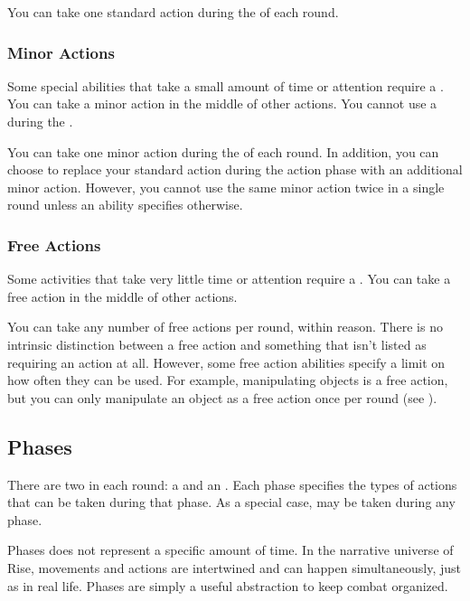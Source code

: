             You can take one standard action during the  of each round.

        \subsubsection{Minor Actions}\label{Minor Actions}
            Some special abilities that take a small amount of time or attention require a .
            You can take a minor action in the middle of other actions.
            You cannot use a  during the .

            You can take one minor action during the  of each round.
            In addition, you can choose to replace your standard action during the action phase with an additional minor action.
            However, you cannot use the same minor action twice in a single round unless an ability specifies otherwise.

        \subsubsection{Free Actions}\label{Free Actions}
            Some activities that take very little time or attention require a .
            You can take a free action in the middle of other actions.

            You can take any number of free actions per round, within reason.
            There is no intrinsic distinction between a free action and something that isn't listed as requiring an action at all.
            However, some free action abilities specify a limit on how often they can be used.
            For example, manipulating objects is a free action, but you can only manipulate an object as a free action once per round (see ).

    \subsection{Phases}\label{Phases}

        There are two  in each round: a  and an .
        Each phase specifies the types of actions that can be taken during that phase.
        As a special case,  may be taken during any phase.

        Phases does not represent a specific amount of time.
        In the narrative universe of Rise, movements and actions are intertwined and can happen simultaneously, just as in real life.
        Phases are simply a useful abstraction to keep combat organized.

